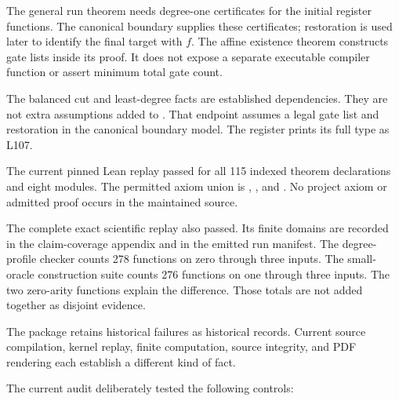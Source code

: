 The general run theorem needs degree-one certificates for the initial
register functions. The canonical boundary supplies these certificates;
restoration is used later to identify the final target with $f$. The affine
existence theorem constructs gate lists inside its proof. It does not expose
a separate executable compiler function or assert minimum total gate count.

The balanced cut and least-degree facts are established dependencies. They
are not extra assumptions added to .
That endpoint assumes a legal gate list and restoration in the canonical
boundary model. The register prints its full type as L107.

The current pinned Lean replay passed for all 115 indexed theorem declarations and eight modules. The permitted axiom union is , , and . No project axiom or admitted proof occurs in the maintained source.

The complete exact scientific replay also passed. Its finite domains are recorded in the claim-coverage appendix and in the emitted run manifest. The degree-profile checker counts 278 functions on zero through three inputs. The small-oracle construction suite counts 276 functions on one through three inputs. The two zero-arity functions explain the difference. Those totals are not added together as disjoint evidence.

The package retains historical failures as historical records. Current source compilation, kernel replay, finite computation, source integrity, and PDF rendering each establish a different kind of fact.

The current audit deliberately tested the following controls:


